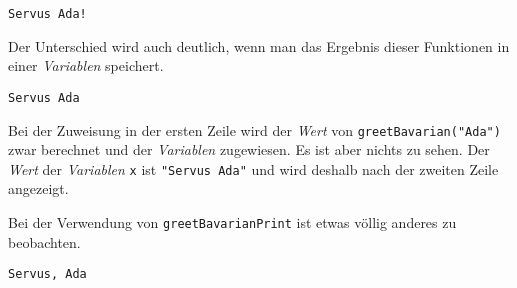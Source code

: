 \label{9d9e1c71-6578-4ac0-aaf8-3a4f973dfb16}
\begin{Shaded}
\begin{Highlighting}[]
\OperatorTok{(}\OperatorTok{)} \OperatorTok{+} 
\end{Highlighting}
\end{Shaded}

\begin{verbatim}
Servus Ada!
\end{verbatim}

\label{46e79931-bb59-41d2-a4b5-2bf0cb95af04}
Der Unterschied wird auch deutlich, wenn man das Ergebnis dieser
Funktionen in einer \emph{Variablen} speichert.

\label{db9e47cc-9189-4dbd-8099-068e84e39a3d}
\begin{Shaded}
\begin{Highlighting}[]
  \OperatorTok{=}\OperatorTok{(}\OperatorTok{)}
\end{Highlighting}
\end{Shaded}

\begin{verbatim}
Servus Ada
\end{verbatim}

\label{63b33bac-000a-4967-9de8-e284178ee99d}
Bei der Zuweisung in der ersten Zeile wird der \emph{Wert} von
\texttt{greetBavarian("Ada")} zwar berechnet und der \emph{Variablen}
zugewiesen. Es ist aber nichts zu sehen. Der \emph{Wert} der
\emph{Variablen} \texttt{x} ist \texttt{"Servus\ Ada"} und wird deshalb
nach der zweiten Zeile angezeigt.

Bei der Verwendung von \texttt{greetBavarianPrint} ist etwas völlig
anderes zu beobachten.

\label{03dd494c-89ab-4551-b43b-a62c7863efb2}
\begin{Shaded}
\begin{Highlighting}[]
  \OperatorTok{=}\OperatorTok{(}\OperatorTok{)}
\end{Highlighting}
\end{Shaded}

\begin{verbatim}
Servus, Ada
\end{verbatim}

